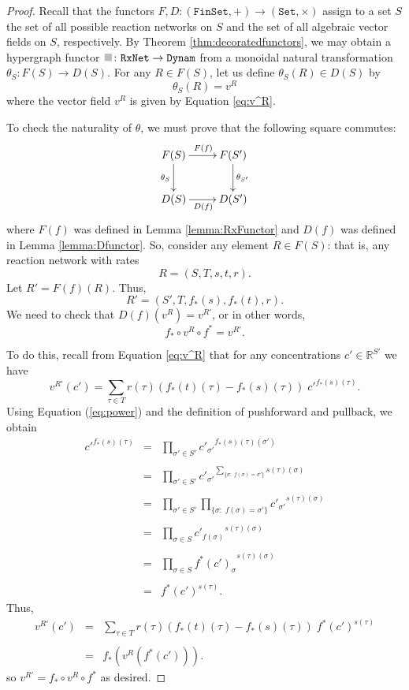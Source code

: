 \documentclass{compositionalityarticle}
\newcommand{\R}{\mathbb{R}}
\newcommand{\FinSet}{\mathtt{FinSet}}
\newcommand{\Set}{\mathtt{Set}}
\newcommand{\RxNet}{\mathtt{RxNet}}
\newcommand{\Dynam}{\mathtt{Dynam}}
\newcommand*{\graysquare}{\textcolor{lightgray}{\blacksquare}}
\newcommand{\maps}{\colon}
\theoremstyle{compositionality}
\theoremstyle{remark}
\begin{document}
\begin{proof}
Recall that the functors $F,D \maps (\FinSet,+) \to (\Set,\times)$ assign to a set $S$ the set of all possible reaction networks on $S$ and the set of all algebraic vector fields on $S$, respectively.  By Theorem \ref{thm:decoratedfunctors}, we may obtain a hypergraph functor $\graysquare \maps \RxNet \to \Dynam$ from a monoidal natural transformation $\theta_S \maps F(S) \to D(S)$.    For any $R \in F(S)$, let us define $\theta_S(R) \in D(S)$ by
\[  \theta_S(R) = v^R \]
where the vector field $v^R$ is given by Equation \ref{eq:v^R}.

To check the naturality of $\theta$, we must prove that the following square commutes:
\[  \xymatrix{   F(S) \ar_{\theta_S}[d] \ar^{F(f)}[r] & F(S') \ar^{\theta_{S'} }[d] \\
D(S) \ar_{D(f)}[r] & D(S') } \]
where $F(f)$ was defined in Lemma \ref{lemma:RxFunctor} and $D(f)$ was defined in Lemma \ref{lemma:Dfunctor}.   So, consider any element $R \in F(S)$: that is, any reaction network with 
rates 
\[    R = (S,T,s,t,r) .\]
Let $R' = F(f)(R)$.   Thus,
\[   R' = (S',T,f_*(s),f_*(t),r).\]
We need to check that $D(f)(v^R) = v^{R'}$, or in other words,
\[    f_* \circ v^R \circ f^* = v^{R'}  .\]

To do this, recall from Equation \ref{eq:v^R} that for any concentrations $c' \in \R^{S'}$ we have
\[    v^{R'}(c') = \sum_{\tau \in T} r(\tau) (f_*(t)(\tau) - f_*(s)(\tau)) \;{c'}^{f_*(s)(\tau)} .\]
Using Equation (\ref{eq:power}) and the definition of pushforward and pullback, we obtain
\[  
\begin{array}{ccl}
{c'}^{f_*(s)(\tau)} &=& \displaystyle{\prod_{\sigma' \in S'} {c'_{\sigma'}}^{f_*(s)(\tau)(\sigma')} }
\\ \\ 
&=& \displaystyle{ \prod_{\sigma' \in S'} {c'_{\sigma'}}^{\sum_{\{\sigma : \; f(\sigma) = \sigma'\}} s(\tau)(\sigma)} } \\ \\
&=& \displaystyle{ \prod_{\sigma' \in S'}  \prod_{\{\sigma : \; f(\sigma) = \sigma'\}} 
{c'_{\sigma'}}^{s(\tau)(\sigma)} } \\ \\
&=& \displaystyle{  \prod_{\sigma \in S} {c'_{f(\sigma)}}^{s(\tau)(\sigma)} }  \\ \\
&=& \displaystyle{  \prod_{\sigma \in S} {f^*(c')_\sigma}^{s(\tau)(\sigma)} }  \\ \\
&=& f^*(c')^{s(\tau)} .
\end{array} 
\]
Thus, 
\[
\begin{array}{ccl}
   v^{R'}(c') &=&
\displaystyle{ \sum_{\tau \in T} r(\tau) (f_*(t)(\tau) - f_*(s)(\tau))  \; f^*(c')^{s(\tau)} } \\ \\
&=& f_*(v^R (f^*(c'))) .
\end{array}
\]
so $v^{R'} = f_* \circ v^R \circ f^*$ as desired.


\end{proof}
\end{document}
